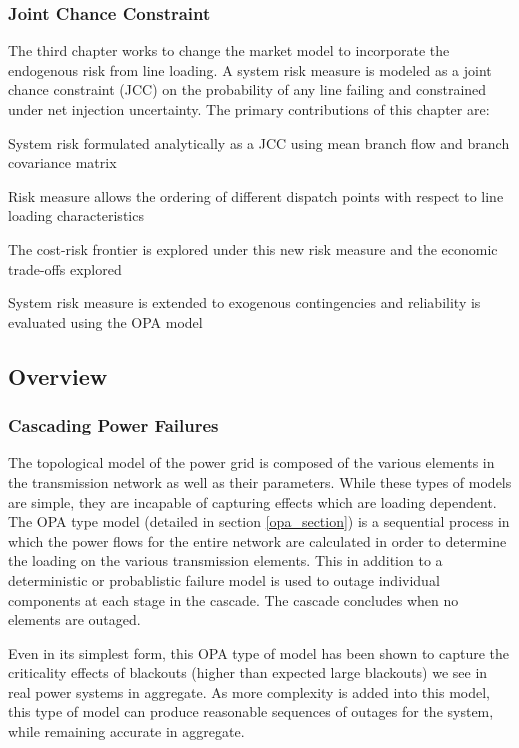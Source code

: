 \subsubsection{Joint Chance Constraint}
The third chapter works to change the market model to incorporate the endogenous risk from line loading.  A system risk measure is modeled as a joint chance constraint (JCC) on the probability of any line failing and constrained under net injection uncertainty.  The primary contributions of this chapter are:
\bi
\item System risk formulated analytically as a JCC using mean branch flow and branch covariance matrix
\item Risk measure allows the ordering of different dispatch points with respect to line loading characteristics
\item The cost-risk frontier is explored under this new risk measure and the economic trade-offs explored
\item System risk measure is extended to exogenous contingencies and reliability is evaluated using the OPA model
\ei

\subsection{Overview}
\subsubsection{Cascading Power Failures}
The topological model of the power grid is composed of the various elements in the transmission network as well as their parameters.  While these types of models are simple, they are incapable of capturing effects which are loading dependent. The OPA type model (detailed in section \ref{opa_section}) is a sequential process in which the power flows for the entire network are calculated in order to determine the loading on the various transmission elements.  This in addition to a deterministic or probablistic failure model is used to outage individual components at each stage in the cascade.  The cascade concludes when no elements are outaged.

Even in its simplest form, this OPA type of model has been shown to capture the criticality effects of blackouts (higher than expected large blackouts) we see in real power systems in aggregate.  As more complexity is added into this model, this type of model can produce reasonable sequences of outages for the system, while remaining accurate in aggregate. 

